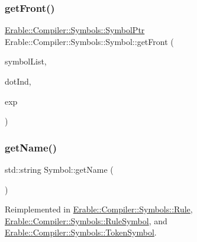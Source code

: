 \subsubsection{\texorpdfstring{getFront()}{getFront()}\hspace{0.1cm}{\footnotesize\ttfamily [3/3]}}
{\footnotesize\ttfamily \mbox{\hyperlink{namespace_erable_1_1_compiler_1_1_symbols_a8f0bc762f448ea4d84e8713ab3e140b9}{Erable\+::\+Compiler\+::\+Symbols\+::\+Symbol\+Ptr}} Erable\+::\+Compiler\+::\+Symbols\+::\+Symbol\+::get\+Front (\begin{DoxyParamCaption}\item[{\mbox{\hyperlink{namespace_erable_1_1_compiler_1_1_symbols_a63e8157d2f729d4689d27bacad42f8ed}{Symbol\+List}} \&}]{symbol\+List,  }\item[{int}]{dot\+Ind,  }\item[{\mbox{\hyperlink{namespace_erable_1_1_compiler_1_1_symbols_a8f0bc762f448ea4d84e8713ab3e140b9}{Symbol\+Ptr}}}]{exp }\end{DoxyParamCaption})\hspace{0.3cm}{\ttfamily [static]}}

\mbox{\label{class_erable_1_1_compiler_1_1_symbols_1_1_symbol_a71aeae736d2ec43f0880341d53bbcc2c}} 
\subsubsection{\texorpdfstring{getName()}{getName()}}
{\footnotesize\ttfamily std\+::string Symbol\+::get\+Name (\begin{DoxyParamCaption}{ }\end{DoxyParamCaption})\hspace{0.3cm}{\ttfamily [virtual]}}



Reimplemented in \mbox{\hyperlink{class_erable_1_1_compiler_1_1_symbols_1_1_rule_a6e71596b90545fe69d089a3e706e4303}{Erable\+::\+Compiler\+::\+Symbols\+::\+Rule}}, \mbox{\hyperlink{class_erable_1_1_compiler_1_1_symbols_1_1_rule_symbol_a5f6cb5a2fc49bc62cc61035cc99464ca}{Erable\+::\+Compiler\+::\+Symbols\+::\+Rule\+Symbol}}, and \mbox{\hyperlink{class_erable_1_1_compiler_1_1_symbols_1_1_token_symbol_a2d9a65967a330721741d7f13ec299745}{Erable\+::\+Compiler\+::\+Symbols\+::\+Token\+Symbol}}.


